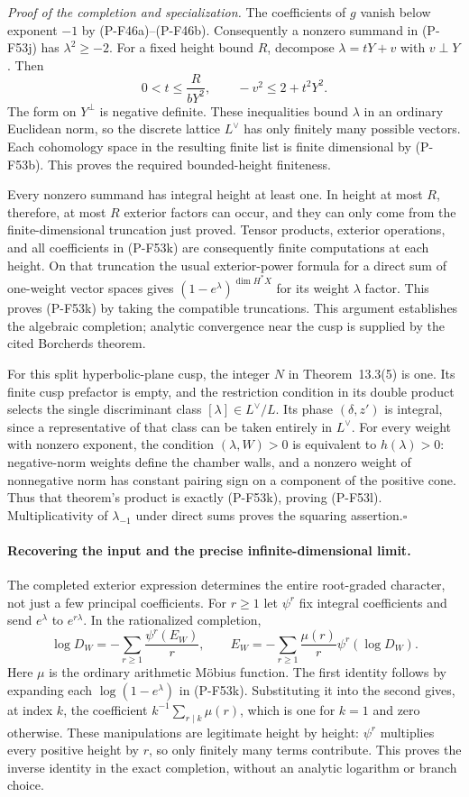 \emph{Proof of the completion and specialization.}
The coefficients of $g$ vanish below exponent $-1$ by
(P-F46a)--(P-F46b). Consequently a nonzero summand in
(P-F53j) has $\lambda^2\ge-2$.
For a fixed height bound $R$, decompose
$\lambda=tY+v$ with $v\perp Y$. Then
\[
 0<t\le \frac{R}{bY^2},\qquad
       -v^2\le 2+t^2Y^2.
 \tag{P-F53m}
\]
The form on $Y^\perp$ is negative definite. These inequalities
bound $\lambda$ in an ordinary Euclidean norm, so the discrete
lattice $L^\vee$ has only finitely many possible vectors.
Each cohomology space in the resulting finite list is finite
dimensional by (P-F53b). This proves the required bounded-height
finiteness.

Every nonzero summand has integral height at least one.
In height at most $R$, therefore, at most $R$ exterior factors
can occur, and they can only come from the finite-dimensional
truncation just proved. Tensor products, exterior operations,
and all coefficients in (P-F53k) are consequently finite
computations at each height. On that truncation the usual
exterior-power formula for a direct sum of one-weight vector
spaces gives $(1-e^\lambda)^{\dim H^*X}$ for its weight
$\lambda$ factor. This proves (P-F53k) by taking the compatible
truncations. This argument establishes the algebraic completion;
analytic convergence near the cusp is supplied by the cited
Borcherds theorem.

For this split hyperbolic-plane cusp, the integer $N$ in
Theorem~13.3(5) is one. Its finite cusp prefactor is empty,
and the restriction condition in its double product selects
the single discriminant class $[\lambda]\in L^\vee/L$.
Its phase $(\delta,z')$ is integral, since a representative
of that class can be taken entirely in $L^\vee$.
For every weight with nonzero exponent, the condition
$(\lambda,W)>0$ is equivalent to $h(\lambda)>0$:
negative-norm weights define the chamber walls, and a
nonzero weight of nonnegative norm has constant pairing
sign on a component of the positive cone. Thus that
theorem's product is exactly (P-F53k), proving (P-F53l).
Multiplicativity of $\lambda_{-1}$ under direct sums proves
the squaring assertion.\hfill$\square$

\paragraph{Recovering the input and the precise infinite-dimensional limit.}
The completed exterior expression determines the entire
root-graded character, not just a few principal coefficients.
For $r\ge1$ let $\psi^r$ fix integral coefficients and send
$e^\lambda$ to $e^{r\lambda}$. In the rationalized completion,
\[
 \log D_W=-\sum_{r\ge1}\frac{\psi^r(E_W)}r,
 \qquad
 E_W=-\sum_{r\ge1}\frac{\mu(r)}r\psi^r(\log D_W).
 \tag{P-F53n}
\]
Here $\mu$ is the ordinary arithmetic M\"obius function.
The first identity follows by expanding each
$\log(1-e^\lambda)$ in (P-F53k). Substituting it into
the second gives, at index $k$, the coefficient
$k^{-1}\sum_{r\mid k}\mu(r)$, which is one for $k=1$
and zero otherwise. These manipulations are legitimate
height by height: $\psi^r$ multiplies every positive
height by $r$, so only finitely many terms contribute.
This proves the inverse identity in the exact completion,
without an analytic logarithm or branch choice.

